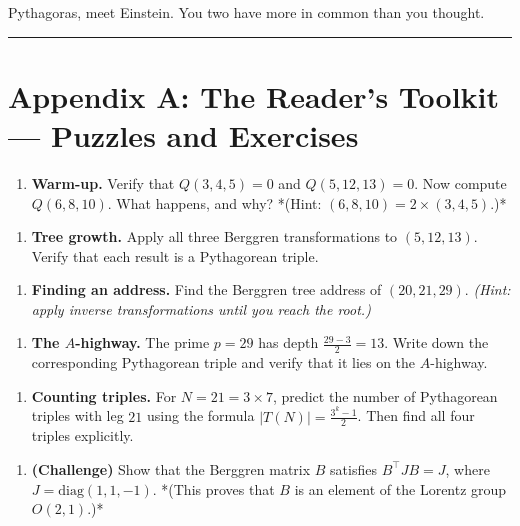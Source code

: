 \documentclass[11pt,openany]{book}
\theoremstyle{definition}
\theoremstyle{plain}
\theoremstyle{remark}
\begin{document}
Pythagoras, meet Einstein. You two have more in common than you thought.

\bigskip\noindent\rule{\textwidth}{0.4pt}\bigskip


\section*{Appendix A: The Reader's Toolkit — Puzzles and Exercises}


\begin{enumerate}
\item \textbf{Warm-up.} Verify that $Q(3, 4, 5) = 0$ and $Q(5, 12, 13) = 0$. Now compute $Q(6, 8, 10)$. What happens, and why? *(Hint: $(6, 8, 10) = 2 \times (3, 4, 5)$.)*
\end{enumerate}

\begin{enumerate}
\item \textbf{Tree growth.} Apply all three Berggren transformations to $(5, 12, 13)$. Verify that each result is a Pythagorean triple.
\end{enumerate}

\begin{enumerate}
\item \textbf{Finding an address.} Find the Berggren tree address of $(20, 21, 29)$. \textit{(Hint: apply inverse transformations until you reach the root.)}
\end{enumerate}

\begin{enumerate}
\item \textbf{The $A$-highway.} The prime $p = 29$ has depth $\frac{29 - 3}{2} = 13$. Write down the corresponding Pythagorean triple and verify that it lies on the $A$-highway.
\end{enumerate}

\begin{enumerate}
\item \textbf{Counting triples.} For $N = 21 = 3 \times 7$, predict the number of Pythagorean triples with leg $21$ using the formula $|T(N)| = \frac{3^k - 1}{2}$. Then find all four triples explicitly.
\end{enumerate}

\begin{enumerate}
\item \textbf{ (Challenge)} Show that the Berggren matrix $B$ satisfies $B^\top J B = J$, where $J = \text{diag}(1, 1, -1)$. *(This proves that $B$ is an element of the Lorentz group $O(2,1)$.)*
\end{enumerate}
\end{document}
